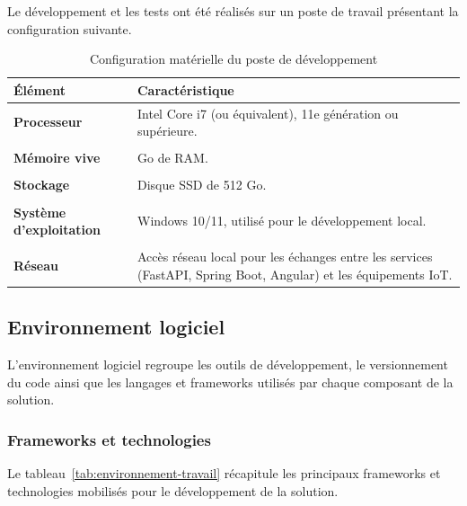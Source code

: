 Le développement et les tests ont été réalisés sur un poste de travail
présentant la configuration suivante.

\begin{table}[H]
\centering
\caption{Configuration matérielle du poste de développement}
\label{tab:environnement-materiel}

\renewcommand{\arraystretch}{1.35}

\begin{tabularx}{\textwidth}{
    >{\bfseries}p{3.6cm}
    >{\raggedright\arraybackslash}X
}

\toprule
Élément & Caractéristique \\
\midrule

Processeur &
Intel Core i7 (ou équivalent), 11e génération ou supérieure. \\
\\[2pt]

Mémoire vive &
16 Go de RAM. \\
\\[2pt]

Stockage &
Disque SSD de 512 Go. \\
\\[2pt]

Système d'exploitation &
Windows 10/11, utilisé pour le développement local. \\
\\[2pt]

Réseau &
Accès réseau local pour les échanges entre les services (FastAPI, Spring
Boot, Angular) et les équipements IoT. \\

\bottomrule

\end{tabularx}
\end{table}

\subsection{Environnement logiciel}

L'environnement logiciel regroupe les outils de développement, le
versionnement du code ainsi que les langages et frameworks utilisés par
chaque composant de la solution.

\subsubsection{Frameworks et technologies}

Le tableau~\ref{tab:environnement-travail} récapitule les principaux
frameworks et technologies mobilisés pour le développement de la solution.

